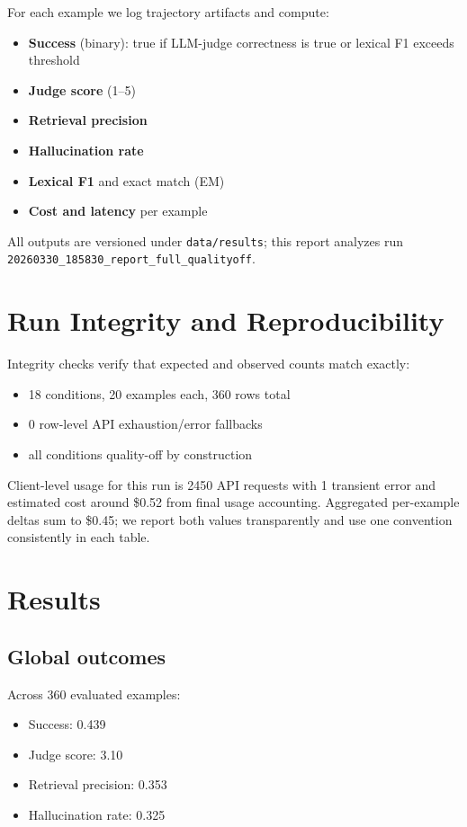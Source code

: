 \documentclass[11pt]{article}
\begin{document}
For each example we log trajectory artifacts and compute:
\begin{itemize}[leftmargin=*, topsep=2pt, itemsep=1pt]
    \item \textbf{Success} (binary): true if LLM-judge correctness is true or lexical F1 exceeds threshold
    \item \textbf{Judge score} (1--5)
    \item \textbf{Retrieval precision}
    \item \textbf{Hallucination rate}
    \item \textbf{Lexical F1} and exact match (EM)
    \item \textbf{Cost and latency} per example
\end{itemize}

All outputs are versioned under \texttt{data/results}; this report analyzes run
\texttt{20260330\_185830\_report\_full\_qualityoff}.

\section{Run Integrity and Reproducibility}
Integrity checks verify that expected and observed counts match exactly:
\begin{itemize}[leftmargin=*, topsep=2pt, itemsep=1pt]
    \item 18 conditions, 20 examples each, 360 rows total
    \item 0 row-level API exhaustion/error fallbacks
    \item all conditions quality-off by construction
\end{itemize}

Client-level usage for this run is 2450 API requests with 1 transient error and estimated cost around \$0.52 from final usage accounting. Aggregated per-example deltas sum to \$0.45; we report both values transparently and use one convention consistently in each table.

\section{Results}
\subsection{Global outcomes}
Across 360 evaluated examples:
\begin{itemize}[leftmargin=*, topsep=2pt, itemsep=1pt]
    \item Success: 0.439
    \item Judge score: 3.10
    \item Retrieval precision: 0.353
    \item Hallucination rate: 0.325
\end{itemize}
\end{document}
